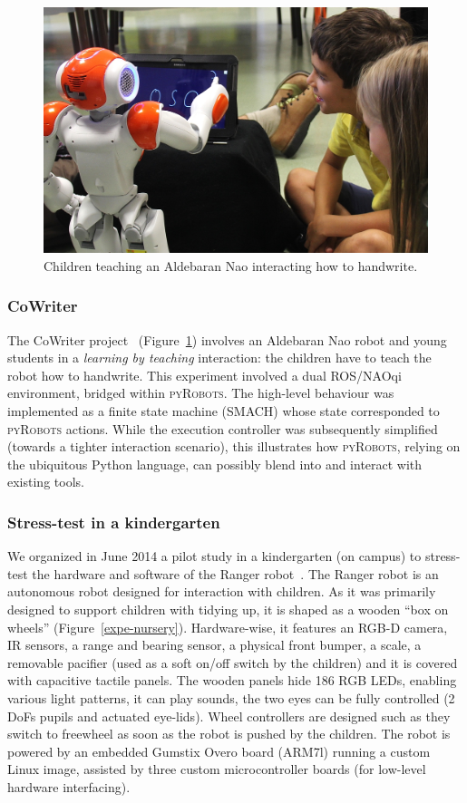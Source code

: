 \documentclass[a4paper, 10pt, conference]{ieeeconf}      %
\newcommand{\pyRobots}{\textsc{pyRobots}}
\begin{document}
\begin{figure}
        \centering
        \includegraphics[width=0.9\columnwidth]{cowriter}
        \caption{Children teaching an Aldebaran Nao interacting how to
        handwrite.}
        \label{expe-cowriter}
\end{figure}

\subsubsection{CoWriter} The {\sc CoWriter} project~\cite{hood2015those}
(Figure~\ref{expe-cowriter}) involves an Aldebaran Nao robot and young students
in a \emph{learning by teaching} interaction: the children have to teach the
robot how to handwrite. This experiment involved a dual ROS/NAOqi environment,
bridged within \pyRobots{}. The high-level behaviour was implemented as a finite
state machine ({\sc SMACH}) whose state corresponded to \pyRobots{} actions.
While the execution controller was subsequently simplified (towards a tighter
interaction scenario), this illustrates how \pyRobots{}, relying on the
ubiquitous Python language, can possibly blend into and interact with existing
tools.

\subsubsection{Stress-test in a kindergarten}
\label{croq}

We organized in June 2014 a pilot study in a kindergarten (on campus) to
stress-test the hardware and software of the Ranger
robot~\cite{mondada2014ranger}. The Ranger robot is an autonomous robot designed
for interaction with children. As it was primarily designed to support children
with tidying up, it is shaped as a wooden ``box on wheels''
(Figure~\ref{expe-nursery}). Hardware-wise, it features an RGB-D camera, IR
sensors, a range and bearing sensor, a physical front bumper, a scale, a
removable pacifier (used as a soft on/off switch by the children) and it is
covered with capacitive tactile panels. The wooden panels hide 186 RGB LEDs,
enabling various light patterns, it can play sounds, the two eyes can be fully
controlled (2 DoFs pupils and actuated eye-lids). Wheel controllers are designed
such as they switch to freewheel as soon as the robot is pushed by the children.
The robot is powered by an embedded Gumstix Overo board (ARM7l) running a custom
Linux image, assisted by three custom microcontroller boards (for low-level
hardware interfacing).
\end{document}

